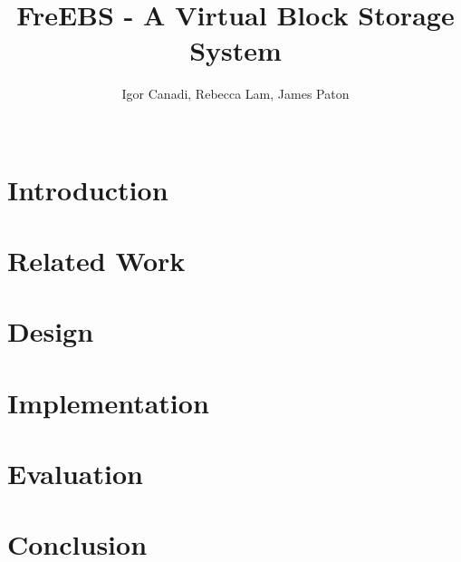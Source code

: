 \documentclass{sig-alternate-10pt}
\begin{document}
\title{FreEBS - A Virtual Block Storage System}

\author{
	\alignauthor Igor Canadi, Rebecca Lam, James Paton\\
	\\
}

\maketitle



\section{Introduction}
\label{sec:intro}


\section{Related Work}
\label{sec:related}


\section{Design}
\label{sec:design}


\section{Implementation}
\label{sec:implementation}


\section{Evaluation}
\label{sec:evaluation}


\section{Conclusion}
\label{sec:conc}




\end{document}
